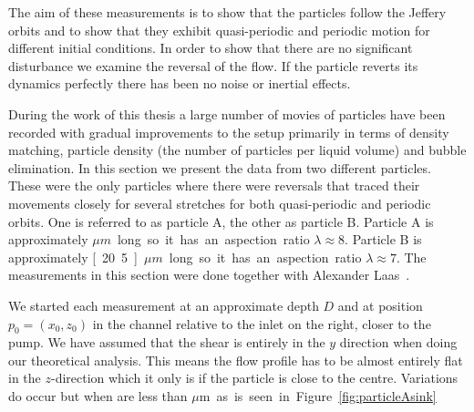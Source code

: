 The aim of these measurements is to show that the particles follow the Jeffery orbits and to show that they exhibit quasi-periodic and periodic motion for different initial conditions. In order to show that there are no significant disturbance we examine the reversal of the flow. If the particle reverts its dynamics perfectly there has been no noise or inertial effects.

During the work of this thesis a large number of movies of particles have been recorded with gradual improvements to the setup primarily in terms of density matching, particle density (the number of particles per liquid volume) and  bubble elimination. In this section we present the data from two different particles. These were the only particles where there were reversals that traced their movements closely for several stretches for both quasi-periodic and periodic orbits. One is referred to as particle A, the other as particle B. Particle A is approximately \unit[24]{$\mu m$} long so it has an aspection ratio $\lambda \approx 8$. Particle B is approximately \unit[20.5]{$\mu m$} long so it has an aspection ratio $\lambda \approx 7$. The measurements in this section were done together with Alexander Laas~\cite{alexanderThesis}.

We started each measurement at an approximate depth $D$ and at position $p_0 = (x_0, z_0)$ in the channel relative to the inlet on the right, closer to the pump. We have assumed that the shear is entirely in the $y$ direction when doing 	our theoretical analysis. This means the flow profile has to be almost entirely flat in the $z$-direction which it only is if the particle is close to the centre. Variations do occur but when are less than \unit[10]{$\mu$m} as is seen in Figure \ref{fig:particleAsink}.

\newpage